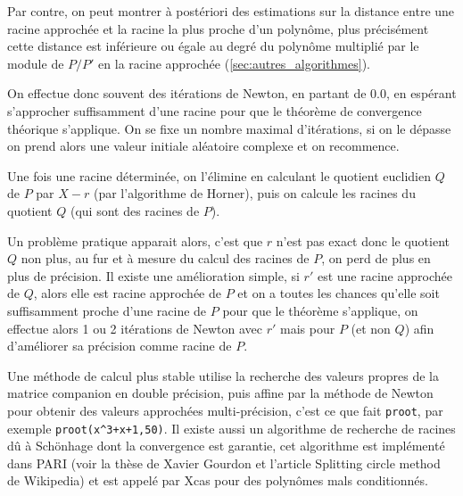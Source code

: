 \documentclass[a4paper,11pt]{book}
\begin{document}
\begin{giacjshere}
Par contre, on peut montrer \`a post\'eriori des estimations sur la
distance entre une racine approch\'ee et la racine la plus proche
d'un polyn\^ome, plus pr\'ecis\'ement cette distance est inf\'erieure
ou \'egale au degr\'e du polyn\^ome multipli\'e par le module
de $P/P'$ en la racine approch\'ee (\ref{sec:autres_algorithmes}).

On effectue donc souvent des it\'erations de Newton, en partant de
0.0, en esp\'erant s'approcher suffisamment d'une racine pour que
le th\'eor\`eme de convergence th\'eorique s'applique. On se fixe
un nombre maximal d'it\'erations, si on le d\'epasse on prend alors
une valeur initiale al\'eatoire complexe et on recommence.

Une fois une racine d\'etermin\'ee, on l'\'elimine en calculant
le quotient euclidien $Q$ de $P$ par $X-r$ (par l'algorithme de Horner),
puis on calcule les racines du quotient $Q$ (qui sont des racines de $P$).

Un probl\`eme pratique apparait alors, c'est que $r$ n'est pas exact
donc le quotient $Q$ non plus, au fur et \`a mesure du calcul des
racines de $P$, on perd de plus en plus de pr\'ecision.
Il existe une am\'elioration simple, si $r'$ est une racine
approch\'ee de $Q$, alors elle est racine approch\'ee de $P$
et on a toutes les chances qu'elle soit suffisamment proche
d'une racine de $P$ pour que le th\'eor\`eme s'applique, on
effectue alors 1 ou 2 it\'erations de Newton avec $r'$ mais pour $P$
(et non $Q$) afin d'am\'eliorer sa pr\'ecision comme racine de $P$.

Une m\'ethode de calcul plus stable utilise la recherche des valeurs
propres de la matrice companion en double pr\'ecision, 
puis affine par la m\'ethode de
Newton pour obtenir des valeurs approch\'ees multi-pr\'ecision,
c'est ce que fait \verb|proot|, par exemple \verb|proot(x^3+x+1,50)|.
Il existe aussi un algorithme de recherche de racines
d\^u \`a Sch\"onhage dont la convergence
est garantie, cet algorithme est impl\'ement\'e dans PARI (voir
la th\`ese de Xavier Gourdon et l'article Splitting circle method de Wikipedia)
et est appel\'e par Xcas pour des polyn\^omes mals conditionn\'es.


\end{giacjshere}
\end{document}
